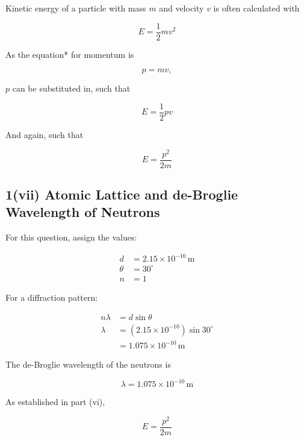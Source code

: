 \documentclass{article}
\begin{document}
Kinetic energy of a particle with mass $m$ and velocity $v$ is often calculated with

\begin{equation*}
E = \frac{1}{2}mv^2
\end{equation*}

As the equation* for momentum is

\begin{equation*}
p = mv,
\end{equation*}

$p$ can be substituted in, such that

\begin{equation*}
E = \frac{1}{2}pv
\end{equation*}

And again, such that

\begin{equation*}
\boxed{E = \frac{p^2}{2m}}
\end{equation*}


\subsection*{1(vii) Atomic Lattice and de-Broglie Wavelength of Neutrons}

For this question, assign the values:

\begin{align*}
d &= 2.15 \times 10^{-10} \,\mathrm{m}\\
\theta &= 30^{\circ} \\
n &= 1
\end{align*}

For a diffraction pattern:

\begin{align*}
n\lambda &= d\sin{\theta} \\
\lambda &= (2.15 \times 10^{-10}) \sin{30^{\circ}} \\
&= 1.075 \times 10^{-10} \,\mathrm{m}
\end{align*}

The de-Broglie wavelength of the neutrons is

\begin{equation*}
\boxed{\lambda = 1.075 \times 10^{-10} \,\mathrm{m}}
\end{equation*}

As established in part (vi),

\begin{equation*}
E = \frac{p^2}{2m}
\end{equation*}
\end{document}
